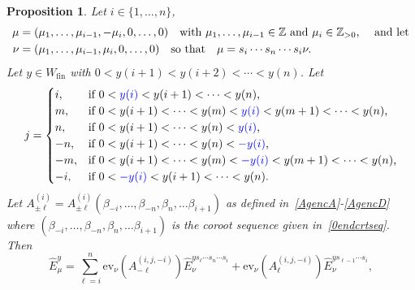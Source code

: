 \documentclass[11pt]{article}
\theoremstyle{plain}
\newtheorem{prop}[thm]{Proposition}
\theoremstyle{definition}
\theoremstyle{remark}
\numberwithin{equation}{section}
\def\ZZ{\mathbb{Z}}
\def\ev{\mathrm{ev}}
\newcounter{r}
\newcounter{s}
\begin{document}
\begin{prop} 
\label{proposition:GeneralCaseAroundTheEnd}
Let $i\in \{1, \ldots, n\}$,
\begin{align*}
\mu &= (\mu_1, \ldots, \mu_{i-1}, -\mu_i, 0, \ldots, 0)
\quad\hbox{with $\mu_1,\ldots, \mu_{i-1} \in \ZZ$ and $\mu_i \in \ZZ_{>0}$, \quad and let} \\
\nu &= (\mu_1, \ldots, \mu_{i-1}, \mu_i, 0, \ldots, 0)
\quad\hbox{so that}\quad \mu = s_i\cdots s_n \cdots s_i\nu.
\end{align*}
Let $y\in W_{\mathrm{fin}}$ with $0 < y(i+1) < y(i+2) < \cdots < y(n)$.
Let
$$j = \begin{cases}
i, &\hbox{if $0<{\color{blue} y(i)} < y(i+1)<\cdots < y(n)$, } \\
m, &\hbox{if $0<y(i+1)<\cdots < y(m)  < {\color{blue} y(i) } < y(m+1) < \cdots < y(n)$,} \\
n, &\hbox{if $0<y(i+1)<\cdots  <y(n)< {\color{blue} y(i)}$,} \\
-n, &\hbox{if $0<y(i+1)<\cdots  <y(n)< {\color{blue} -y(i)}$,} \\
-m, &\hbox{if $0<y(i+1)<\cdots < y(m) < {\color{blue} -y(i)} < y(m+1) < \cdots < y(n)$,} \\
-i, &\hbox{if $0 < {\color{blue} -y(i)} < y(i+1)<\cdots <y(n)$.}
\end{cases}
$$
Let $A^{(i)}_{\pm\ell}= A^{(i)}_{\pm\ell}(\beta_{-i}, \ldots, \beta_{-n}, \beta_n, \ldots \beta_{i+1})$ as defined in~\eqref{AgencA}-\eqref{AgencD}
where $(\beta_{-i}, \ldots, \beta_{-n}, \beta_n, \ldots \beta_{i+1})$ is the coroot sequence given in~\eqref{0endcrtseq}.
Then 
$$\widehat{E}^y_\mu
= \sum_{\ell = i}^n 
\ev_\nu(A^{(i,j,-i)}_{-\ell}) \widehat{E}^{ys_\ell \cdots s_n\cdots s_i}_\nu
+\ev_\nu(A^{(i,j,-i)}_{\ell}) \widehat{E}^{ys_{\ell-1} \cdots s_i}_\nu,
$$
\end{prop}
\end{document}
